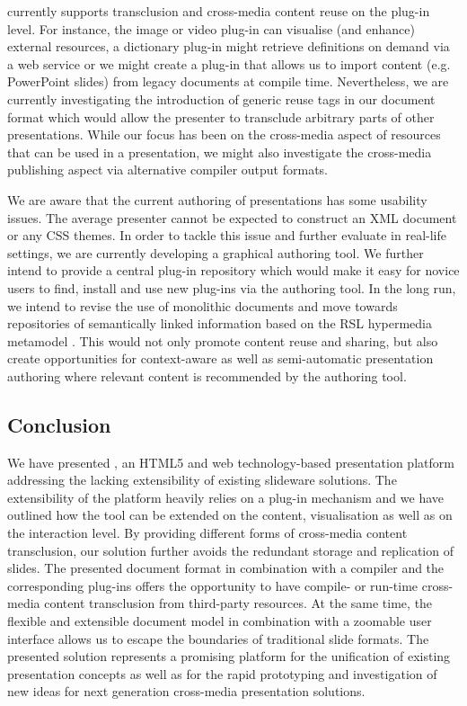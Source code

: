 \documentclass[a4paper,12pt]{report}
\begin{document}
    \mxp currently supports transclusion and cross-media content reuse on the
    plug-in level. For instance, the image or video plug-in can visualise (and
    enhance) external resources, a dictionary plug-in might retrieve
    definitions on demand via a web service or we might create a plug-in that
    allows us to import content (e.g. PowerPoint slides) from legacy documents
    at compile time. Nevertheless, we are currently investigating the
    introduction of generic reuse tags in our document format which would allow
    the presenter to transclude arbitrary parts of other \mxp presentations.
    While our focus has been on the cross-media aspect of resources that can be
    used in a presentation, we might also investigate the cross-media
    publishing aspect via alternative compiler output formats.

    We are aware that the current authoring of \mxp presentations has some
    usability issues. The average presenter cannot be expected to construct an
    XML document or any CSS themes. In order to tackle this issue and further
    evaluate \mxp in real-life settings, we are currently developing a
    graphical \mxp authoring tool. We further intend to provide a central
    plug-in repository which would make it easy for novice users to find,
    install and use new plug-ins via the authoring tool. In the long run, we
    intend to revise the use of monolithic documents and move towards
    repositories of semantically linked information based on the RSL hypermedia
    metamodel \citep{signer-3}. This would not only promote content reuse and
    sharing, but also create opportunities for context-aware as well as
    semi-automatic presentation authoring where relevant content is recommended
    by the authoring tool.

   \subsection{Conclusion}

    We have presented \mxp, an HTML5 and web technology-based presentation
    platform addressing the lacking extensibility of existing slideware
    solutions. The extensibility of the \mxp platform heavily relies on a
    plug-in mechanism and we have outlined how the tool can be extended on the
    content, visualisation as well as on the interaction level. By providing
    different forms of cross-media content transclusion, our solution further
    avoids the redundant storage and replication of slides. The presented \mxp
    document format in combination with a compiler and the corresponding
    plug-ins offers the opportunity to have compile- or run-time cross-media
    content transclusion from third-party resources. At the same time, the
    flexible and extensible document model in combination with a zoomable user
    interface allows us to escape the boundaries of traditional slide formats.
    The presented \mxp solution represents a promising platform for the
    unification of existing presentation concepts as well as for the rapid
    prototyping and investigation of new ideas for next generation cross-media
    presentation solutions.
\end{document}
